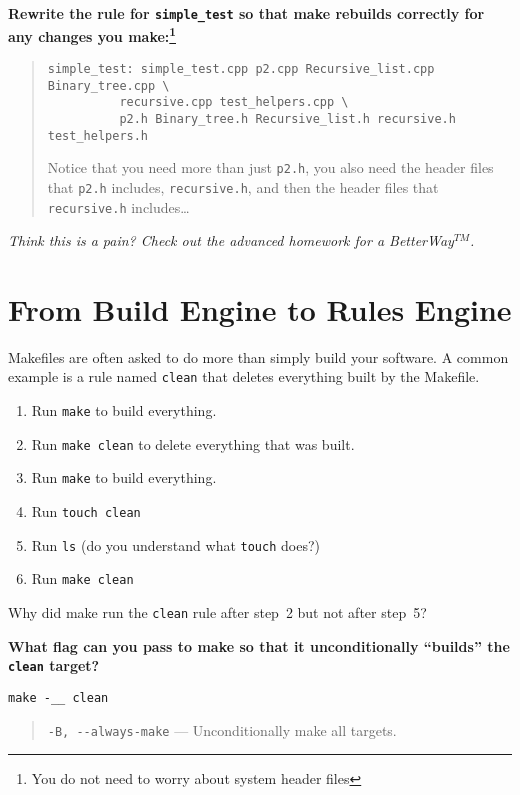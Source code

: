 \documentclass{article}
\begin{document}
\textbf{Rewrite the rule for \texttt{simple\_test} so that make rebuilds
correctly for any changes you make:\footnote{You do not need to worry about
  system header files}}
\begin{quote}
  \color{violet}
  \begin{lstlisting}
simple_test: simple_test.cpp p2.cpp Recursive_list.cpp Binary_tree.cpp \
	      recursive.cpp test_helpers.cpp \
	      p2.h Binary_tree.h Recursive_list.h recursive.h test_helpers.h
  \end{lstlisting}

  Notice that you need more than just \texttt{p2.h}, you also need the header
  files that \texttt{p2.h} includes, \texttt{recursive.h}, and then the header
  files that \texttt{recursive.h} includes\dots
\end{quote}

\emph{\small Think this is a pain? Check out the advanced homework for a
  BetterWay$^{TM}$.}


\section{From Build Engine to Rules Engine}

Makefiles are often asked to do more than simply build your software. A common
example is a rule named \texttt{clean} that deletes everything built by the
Makefile.

\begin{enumerate}\small
  \item Run \texttt{make} to build everything.
  \item Run \texttt{make clean} to delete everything that was built.
  \item Run \texttt{make} to build everything.
  \item Run \texttt{touch clean}
  \item Run \texttt{ls} {(\footnotesize do you understand what \texttt{touch} does?)}
  \item Run \texttt{make clean}
\end{enumerate}

Why did make run the \texttt{clean} rule after step~2 but not after step~5?

\textbf{What flag can you pass to make so that it unconditionally ``builds''
  the \texttt{clean} target?}

\texttt{make -\_\_ clean}
\begin{quote}
  \color{violet}
  \texttt{-B, -{}-always-make} --- Unconditionally make all targets.
\end{quote}
\end{document}
